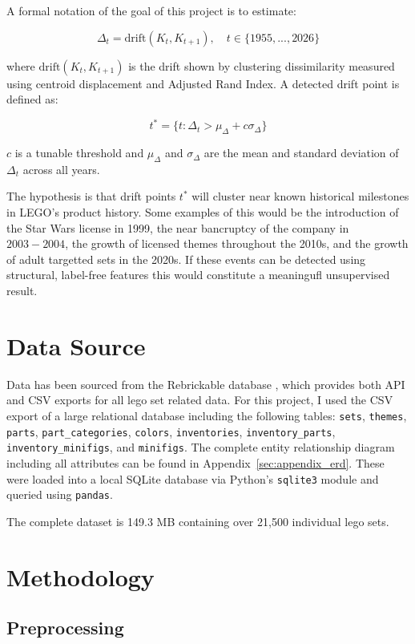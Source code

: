 \documentclass[11pt, letterpaper]{article}
\begin{document}
A formal notation of the goal of this project is to estimate:

\[
\Delta_t = \text{drift}(K_t, K_{t+1}), \quad t \in \{1955, ..., 2026\}
\]

where $\text{drift}(K_t, K_{t+1})$ is the drift shown by clustering dissimilarity measured using centroid displacement and Adjusted Rand Index. A detected drift point is defined as:

\[
t^* = \{t:\Delta_t > \mu_{\Delta} + c \sigma_{\Delta}\}
\]

$c$ is a tunable threshold and $\mu_{\Delta}$ and $\sigma_{\Delta}$ are the mean and standard deviation of $\Delta_t$ across all years. 

The hypothesis is that drift points $t^*$ will cluster near known historical milestones in LEGO's product history. Some examples of this would be the introduction of the Star Wars license in 1999, the near bancruptcy of the company in $2003-2004$, the growth of licensed themes throughout the 2010s, and the growth of adult targetted sets in the 2020s. If these events can be detected using structural, label-free features this would constitute a meaningufl unsupervised result. 

\section{Data Source}

Data has been sourced from the Rebrickable database \cite{rebrickable2024}, which provides both API and CSV exports for all lego set related data. For this project, I used the CSV export of a large relational database including the following tables: \texttt{sets}, \texttt{themes}, \texttt{parts}, \texttt{part\_categories}, \texttt{colors}, \texttt{inventories}, \texttt{inventory\_parts}, \texttt{inventory\_minifigs}, and \texttt{minifigs}. The complete entity relationship diagram including all attributes can be found in Appendix~\ref{sec:appendix_erd}. These were loaded into a local SQLite database via Python's \texttt{sqlite3} module and queried using \texttt{pandas}. 

The complete dataset is 149.3 MB containing over 21,500 individual lego sets. 

\section{Methodology}

\subsection{Preprocessing}
\end{document}
